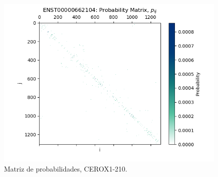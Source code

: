 \documentclass[a4paper,11pt,titlepage]{article}
\theoremstyle{definition}
\begin{document}
\begin{figure}[H]
    \hfill
    \begin{minipage}[c]{0.31\textwidth}
        \centering
        \includegraphics[width=\textwidth]{images/CEROX1-210-db_iter-matrix.png}
        \caption{Matriz de probabilidades, CEROX1-210.}
        \label{fig:CEROX1-210-matrix}
    \end{minipage}
\end{figure}
\end{document}
